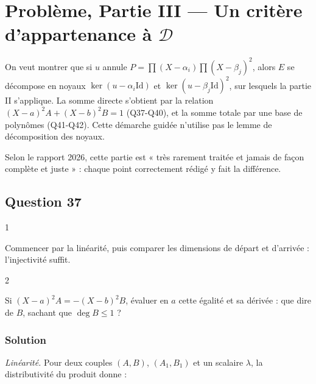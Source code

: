 \documentclass[11pt,a4paper]{article}
\begin{document}
\hypertarget{probluxe8me-partie-iii-un-crituxe8re-dappartenance-uxe0-mathcal-d}{%
\section{\texorpdfstring{Problème, Partie III --- Un critère d'appartenance à \(\mathcal D\)}{Problème, Partie III --- Un critère d'appartenance à \textbackslash mathcal D}}\label{probluxe8me-partie-iii-un-crituxe8re-dappartenance-uxe0-mathcal-d}}

On veut montrer que si \(u\) annule \(P=\prod(X-\alpha_i)\prod(X-\beta_j)^2\), alors \(E\) se décompose en noyaux \(\ker(u-\alpha_i\mathrm{Id})\) et \(\ker(u-\beta_j\mathrm{Id})^2\), sur lesquels la partie II s'applique. La somme directe s'obtient par la relation \((X-a)^2A+(X-b)^2B=1\) (Q37-Q40), et la somme totale par une base de polynômes (Q41-Q42). Cette démarche guidée n'utilise pas le lemme de décomposition des noyaux.

Selon le rapport 2026, cette partie est « très rarement traitée et jamais de façon complète et juste » : chaque point correctement rédigé y fait la différence.

\hypertarget{question-37}{%
\subsection{Question 37}\label{question-37}}

\begin{indication}{1}

Commencer par la linéarité, puis comparer les dimensions de départ et d'arrivée : l'injectivité suffit.

\end{indication}

\begin{indication}{2}

Si \((X-a)^2A=-(X-b)^2B\), évaluer en \(a\) cette égalité et sa dérivée : que dire de \(B\), sachant que \(\deg B\le1\) ?

\end{indication}

\hypertarget{solution-36}{%
\subsubsection{Solution}\label{solution-36}}

\emph{Linéarité.} Pour deux couples \((A,B)\), \((A_1,B_1)\) et un scalaire \(\lambda\), la distributivité du produit donne :
\end{document}

